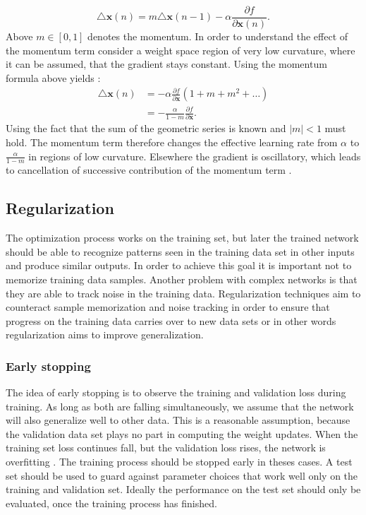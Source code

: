 \begin{equation}
\triangle \mathbf{x}(n) = m\triangle \mathbf{x}(n-1) -\alpha \frac{\partial f}{\partial \mathbf{x}(n)}.
\end{equation}
Above $m \in [0,1]$ denotes the momentum. In order to understand the effect of the momentum term consider a weight space region of very low curvature, where it can be assumed, that the gradient stays constant. Using the momentum formula above yields \cite[page 267]{Bishop1995}:
\begin{align}
\triangle \mathbf{x}(n) &= -\alpha \frac{\partial f}{\partial \mathbf{x}} (1 + m + m^2 + \dots) \\
						&= -\frac{\alpha}{ 1 - m}\frac{\partial f}{\partial \mathbf{x}}.
\end{align}
Using the fact that the sum of the geometric series is known and $|m| < 1$ must hold. The momentum term therefore changes the effective learning rate from $\alpha$ to $\frac{\alpha}{ 1 - m}$ in regions of low curvature. Elsewhere the gradient is oscillatory, which leads to cancellation of successive contribution of the momentum term \cite[page 267]{Bishop1995}.

\subsection{Regularization}
The optimization process works on the training set, but later the trained network should be able to recognize patterns seen in the training data set in other inputs and produce similar outputs. In order to achieve this goal it is important not to memorize training data samples. Another problem with complex networks is that they are able to track noise in the training data.
Regularization techniques aim to counteract sample memorization and noise tracking in order to ensure that progress on the training data carries over to new data sets or in other words regularization aims to improve generalization.

\subsubsection{Early stopping}
The idea of early stopping is to observe the training and validation loss during training. As long as both are falling simultaneously, we assume that
the network will also generalize well to other data. This is a reasonable assumption, because the validation data set plays no part in computing the weight updates. When the training set loss continues fall, but the validation loss rises, the network is overfitting \cite[page 31]{Graves2012}. The training process should be stopped early in theses cases.
A test set should be used to guard against parameter choices that work well only on the training and validation set. Ideally the performance on the test set should only be evaluated, once the training process has finished.

